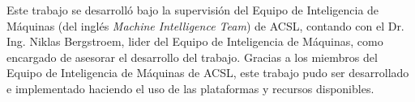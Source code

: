 Este trabajo se desarrolló bajo la supervisión del Equipo de Inteligencia de Máquinas (del inglés \textit{Machine Intelligence Team}) de ACSL, contando con el Dr. Ing. Niklas Bergstroem, lider del Equipo de Inteligencia de Máquinas, como encargado de asesorar el desarrollo del trabajo. Gracias a los miembros del Equipo de Inteligencia de Máquinas de ACSL, este trabajo pudo ser desarrollado e implementado haciendo el uso de las plataformas y recursos disponibles.
